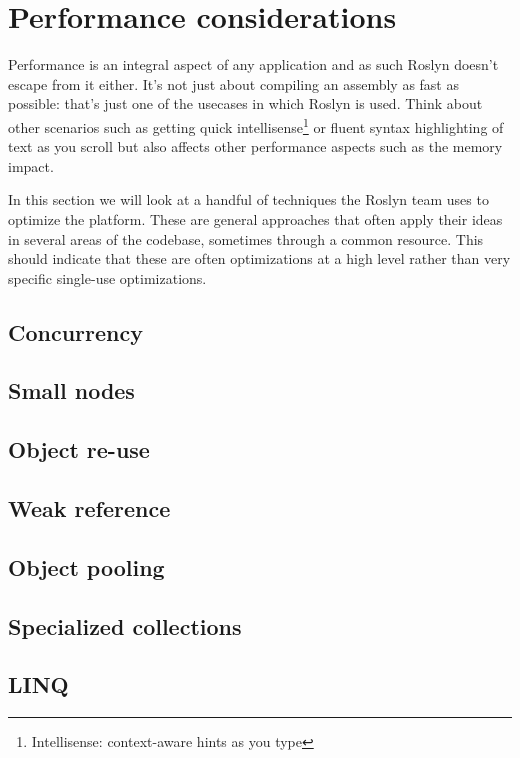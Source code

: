 \section{Performance considerations}
\label{sec:performance}

Performance is an integral aspect of any application and as such Roslyn doesn't escape from it either. It's not just about compiling an assembly as fast as possible: that's just one of the usecases in which Roslyn is used. Think about other scenarios such as getting quick intellisense\footnote{Intellisense: context-aware hints as you type} or fluent syntax highlighting of text as you scroll but also affects other performance aspects such as the memory impact.

In this section we will look at a handful of techniques the Roslyn team uses to optimize the platform. These are general approaches that often apply their ideas in several areas of the codebase, sometimes through a common resource. This should indicate that these are often optimizations at a high level rather than very specific single-use optimizations. 

\subsection{Concurrency}
\label{sec:concurrency}

\subsection{Small nodes}
\label{sec:small-nodes}

\subsection{Object re-use}
\label{sec:object-reuse}

\subsection{Weak reference}
\label{sec:weak-references}

\subsection{Object pooling}
\label{sec:object-pooling}

\subsection{Specialized collections}
\label{sec:specialized-collections}

\subsection{LINQ}
\label{sec:linq}
















